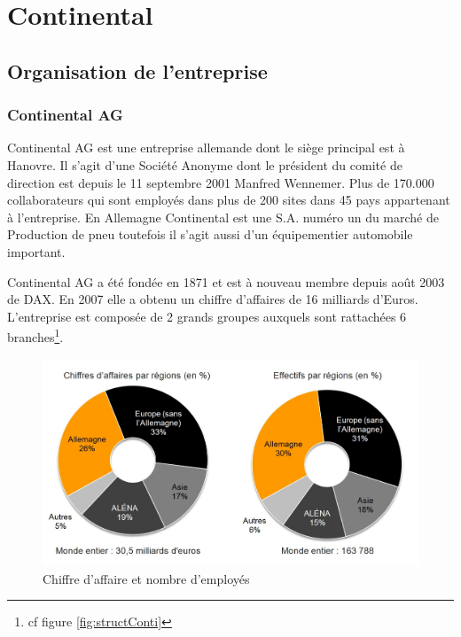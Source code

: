 \chapter{Continental}
	\section{Organisation de l'entreprise}
		\subsection{Continental AG}
		Continental AG est une entreprise allemande dont le siège principal est à Hanovre. Il s'agit d'une Société Anonyme dont le président du comité de direction est depuis le 11 septembre 2001 Manfred Wennemer. Plus de 170.000 collaborateurs qui sont employés dans plus de 200 sites dans 45 pays appartenant à l'entreprise. En Allemagne Continental est une S.A. numéro un du marché de Production de pneu toutefois il s'agit aussi d'un équipementier automobile important. 

		Continental AG a été fondée en 1871 et est à nouveau membre depuis août 2003 de DAX. En 2007 elle a obtenu un chiffre d'affaires de 16 milliards d'Euros. L'entreprise est composée de 2 grands groupes auxquels sont rattachées 6 branches\footnote{cf figure \ref{fig:structConti}}.
		 
		 \begin{figure}[H]
		 	\centering
		 	\includegraphics[width=12cm]{contents/images/caConti.jpg}
		 	\caption{Chiffre d'affaire et nombre d'employés}
		 	\label{fig:caConti}
		 \end{figure}

